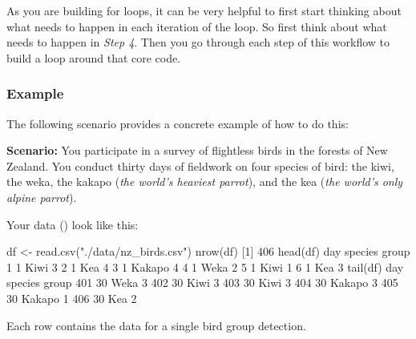 \documentclass[
]{book}
\newenvironment{Shaded}{\begin{snugshade}}{\end{snugshade}}
\newcommand{\DecValTok}[1]{\textcolor[rgb]{0.00,0.00,0.81}{#1}}
\newcommand{\FunctionTok}[1]{\textcolor[rgb]{0.00,0.00,0.00}{#1}}
\newcommand{\NormalTok}[1]{#1}
\newcommand{\OtherTok}[1]{\textcolor[rgb]{0.56,0.35,0.01}{#1}}
\newcommand{\StringTok}[1]{\textcolor[rgb]{0.31,0.60,0.02}{#1}}
\begin{document}
As you are building for loops, it can be very helpful to first start thinking about what needs to happen in each iteration of the loop. So first think about what needs to happen in \emph{Step 4}. Then you go through each step of this workflow to build a loop around that core code.

\hypertarget{example}{%
\subsubsection*{Example}\label{example}}

The following scenario provides a concrete example of how to do this:

\textbf{Scenario:} You participate in a survey of flightless birds in the forests of New Zealand. You conduct thirty days of fieldwork on four species of bird: the kiwi, the weka, the kakapo (\emph{the world's heaviest parrot}), and the kea (\emph{the world's only alpine parrot}).

Your data () look like this:

\begin{Shaded}
\begin{Highlighting}[]
\NormalTok{df }\OtherTok{\textless{}{-}} \FunctionTok{read.csv}\NormalTok{(}\StringTok{"./data/nz\_birds.csv"}\NormalTok{)}
\FunctionTok{nrow}\NormalTok{(df)}
\NormalTok{[}\DecValTok{1}\NormalTok{] }\DecValTok{406}
\FunctionTok{head}\NormalTok{(df)}
\NormalTok{  day species group}
\DecValTok{1}   \DecValTok{1}\NormalTok{    Kiwi     }\DecValTok{3}
\DecValTok{2}   \DecValTok{1}\NormalTok{     Kea     }\DecValTok{4}
\DecValTok{3}   \DecValTok{1}\NormalTok{  Kakapo     }\DecValTok{4}
\DecValTok{4}   \DecValTok{1}\NormalTok{    Weka     }\DecValTok{2}
\DecValTok{5}   \DecValTok{1}\NormalTok{    Kiwi     }\DecValTok{1}
\DecValTok{6}   \DecValTok{1}\NormalTok{     Kea     }\DecValTok{3}
\FunctionTok{tail}\NormalTok{(df)}
\NormalTok{    day species group}
\DecValTok{401}  \DecValTok{30}\NormalTok{    Weka     }\DecValTok{3}
\DecValTok{402}  \DecValTok{30}\NormalTok{    Kiwi     }\DecValTok{3}
\DecValTok{403}  \DecValTok{30}\NormalTok{    Kiwi     }\DecValTok{3}
\DecValTok{404}  \DecValTok{30}\NormalTok{  Kakapo     }\DecValTok{3}
\DecValTok{405}  \DecValTok{30}\NormalTok{  Kakapo     }\DecValTok{1}
\DecValTok{406}  \DecValTok{30}\NormalTok{     Kea     }\DecValTok{2}
\end{Highlighting}
\end{Shaded}

Each row contains the data for a single bird group detection.
\end{document}
